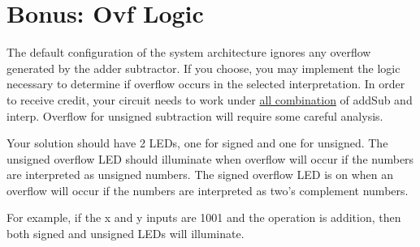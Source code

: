     \section{Bonus: Ovf Logic}

    The default configuration of the system architecture ignores any
    overflow generated by the adder subtractor. If you choose, you may
    implement the logic necessary to determine if overflow occurs in the
    selected interpretation. In order to receive credit, your circuit needs
    to work under \uline{all combination} of addSub and interp. Overflow for
    unsigned subtraction will require some careful analysis.

    Your solution should have 2 LEDs, one for signed and one for unsigned.
    The unsigned overflow LED should illuminate when overflow will occur if
    the numbers are interpreted as unsigned numbers. The signed overflow LED
    is on when an overflow will occur if the numbers are interpreted as
    two's complement numbers.

    For example, if the x and y inputs are 1001 and the operation is
    addition, then both signed and unsigned LEDs will illuminate.
